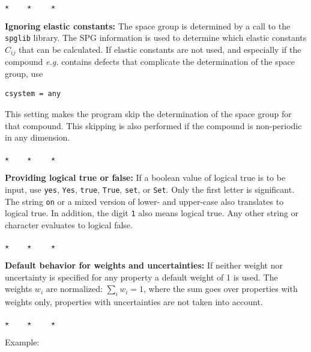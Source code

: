 \documentclass[a4paper,12pt,pdftex,onecolumn]{article}
\newcommand{\eg}{\emph{e.g.}\xspace}
\newcommand{\stars}{\begin{center}%
\vspace{1em plus 0.5em minus 0.5em}%
$\star \qquad \star \qquad \star$%
\vspace{1em plus 0.5em minus 0.5em}%
\end{center}}
\begin{document}
\stars

\textbf{Ignoring elastic constants:}
The space group is determined by a call to the \verb+spglib+ library.
The SPG information is used to determine which elastic constants $C_{ij}$ that can be
calculated. If elastic constants are not used, and especially if the compound \eg
contains defects that complicate the determination of the space group, use

\begin{Verbatim}[fontsize=\relsize{-1},frame=single]
csystem = any
\end{Verbatim}

This setting makes the program skip the determination of the space group for that
compound. This skipping is also performed if the compound is non-periodic in any
dimension.

\stars

\textbf{Providing logical true or false:}
If a boolean value of logical true is to be input, use
\verb+yes+, \verb+Yes+, \verb+true+, \verb+True+, \verb+set+, or \verb+Set+.
Only the first letter is significant. The string \verb+on+
or a mixed version of lower- and upper-case also translates to logical true.
In addition, the digit \verb+1+ also means logical true.
Any other string or character evaluates to logical false.

\stars

\textbf{Default behavior for weights and uncertainties:}
If neither weight nor uncertainty is specified for any property a default weight of 1
is used. The weights $w_i$ are normalized: $\sum_i w_i = 1$, where the sum goes over
properties with weights only, properties with uncertainties are not taken into account.


\stars

Example:
\end{document}
